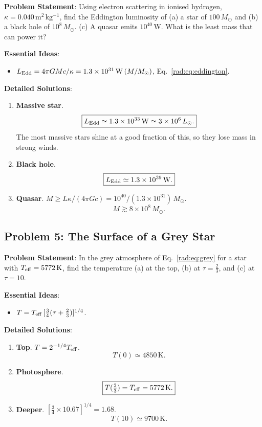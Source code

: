\textbf{Problem Statement}: Using electron scattering in ionised hydrogen, $\kappa=0.040\,\mathrm{m^2\,kg^{-1}}$, find the Eddington luminosity of (a) a star of $100\,M_\odot$ and (b) a black hole of $10^8\,M_\odot$. (c) A quasar emits $10^{40}\,\mathrm W$. What is the least mass that can power it?

\textbf{Essential Ideas}:
\begin{itemize}
	\item $L_{\rm Edd}=4\pi GMc/\kappa=1.3\times10^{31}\,\mathrm W\,(M/M_\odot)$, Eq.~\eqref{rad:eq:eddington}.
\end{itemize}

\textbf{Detailed Solutions}:
\begin{enumerate}[label=(\alph*)]
	\item \textbf{Massive star}.
	\[
	\boxed{L_{\rm Edd}\simeq1.3\times10^{33}\,\mathrm W\simeq3\times10^6\,L_\odot.}
	\]
	The most massive stars shine at a good fraction of this, so they lose mass in strong winds.
	\item \textbf{Black hole}.
	\[
	\boxed{L_{\rm Edd}\simeq1.3\times10^{39}\,\mathrm W.}
	\]
	\item \textbf{Quasar}. $M\ge L\kappa/(4\pi Gc)=10^{40}/(1.3\times10^{31})\,M_\odot$.
	\[
	\boxed{M\gtrsim8\times10^8\,M_\odot.}
	\]
\end{enumerate}

\subsection{Problem 5: The Surface of a Grey Star}
\label{rad:prob:grey}

\textbf{Problem Statement}: In the grey atmosphere of Eq.~\eqref{rad:eq:grey} for a star with $T_{\rm eff}=5772\,\mathrm K$, find the temperature (a) at the top, (b) at $\tau=\tfrac23$, and (c) at $\tau=10$.

\textbf{Essential Ideas}:
\begin{itemize}
	\item $T=T_{\rm eff}\,[\tfrac34(\tau+\tfrac23)]^{1/4}$.
\end{itemize}

\textbf{Detailed Solutions}:
\begin{enumerate}[label=(\alph*)]
	\item \textbf{Top}. $T=2^{-1/4}T_{\rm eff}$.
	\[
	\boxed{T(0)\simeq4850\,\mathrm K.}
	\]
	\item \textbf{Photosphere}.
	\[
	\boxed{T(\tfrac23)=T_{\rm eff}=5772\,\mathrm K.}
	\]
	\item \textbf{Deeper}. $[\tfrac34\times10.67]^{1/4}=1.68$.
	\[
	\boxed{T(10)\simeq9700\,\mathrm K.}
	\]
\end{enumerate}

